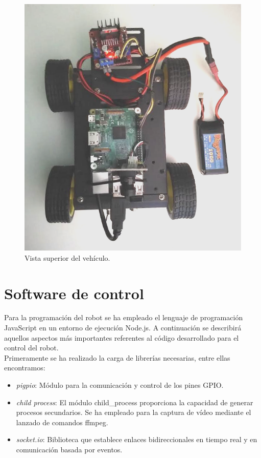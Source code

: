 \begin{figure}[H]
  \begin{center}
    \includegraphics[scale=0.4]{imagenes/robot/robot-bateria-lipo.png}
  \end{center}
  \caption{Vista superior del vehículo.}
  \label{figura:rpi-modulo-bateria}
\end{figure}


    
\section{Software de control}
  

Para la programación del robot se ha empleado el lenguaje de programación JavaScript en un entorno de ejecución Node.js. A continuación se describirá aquellos aspectos más importantes
referentes al código desarrollado para el control del robot.\\

Primeramente se ha realizado la carga de librerías necesarias, entre ellas encontramos:

\begin{itemize}
 \item \emph{pigpio}: Módulo para la comunicación y control de los pines GPIO.
 \item \emph{child process}: El módulo child\_process proporciona la capacidad de generar procesos secundarios. Se ha empleado para la captura de vídeo mediante el lanzado de comandos ffmpeg.
 \item \emph{socket.io}: Biblioteca que establece enlaces bidireccionales en tiempo real y en comunicación basada por eventos.
\end{itemize}


